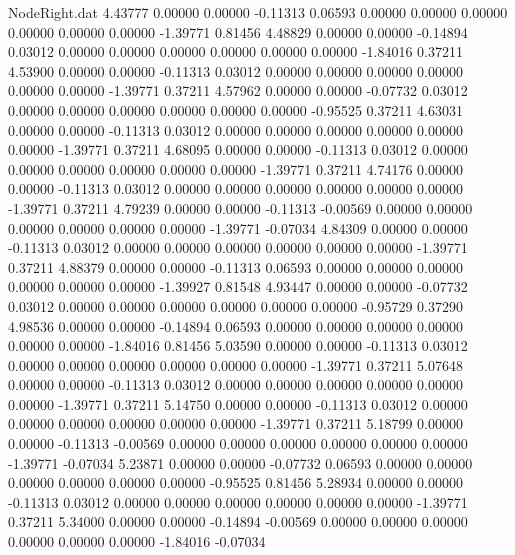 \begin{filecontents}{NodeRight.dat}
   4.43777    0.00000    0.00000    -0.11313    0.06593    0.00000    0.00000    0.00000    0.00000    0.00000    0.00000   -1.39771    0.81456
   4.48829    0.00000    0.00000    -0.14894    0.03012    0.00000    0.00000    0.00000    0.00000    0.00000    0.00000   -1.84016    0.37211
   4.53900    0.00000    0.00000    -0.11313    0.03012    0.00000    0.00000    0.00000    0.00000    0.00000    0.00000   -1.39771    0.37211
   4.57962    0.00000    0.00000    -0.07732    0.03012    0.00000    0.00000    0.00000    0.00000    0.00000    0.00000   -0.95525    0.37211
   4.63031    0.00000    0.00000    -0.11313    0.03012    0.00000    0.00000    0.00000    0.00000    0.00000    0.00000   -1.39771    0.37211
   4.68095    0.00000    0.00000    -0.11313    0.03012    0.00000    0.00000    0.00000    0.00000    0.00000    0.00000   -1.39771    0.37211
   4.74176    0.00000    0.00000    -0.11313    0.03012    0.00000    0.00000    0.00000    0.00000    0.00000    0.00000   -1.39771    0.37211
   4.79239    0.00000    0.00000    -0.11313   -0.00569    0.00000    0.00000    0.00000    0.00000    0.00000    0.00000   -1.39771   -0.07034
   4.84309    0.00000    0.00000    -0.11313    0.03012    0.00000    0.00000    0.00000    0.00000    0.00000    0.00000   -1.39771    0.37211
   4.88379    0.00000    0.00000    -0.11313    0.06593    0.00000    0.00000    0.00000    0.00000    0.00000    0.00000   -1.39927    0.81548
   4.93447    0.00000    0.00000    -0.07732    0.03012    0.00000    0.00000    0.00000    0.00000    0.00000    0.00000   -0.95729    0.37290
   4.98536    0.00000    0.00000    -0.14894    0.06593    0.00000    0.00000    0.00000    0.00000    0.00000    0.00000   -1.84016    0.81456
   5.03590    0.00000    0.00000    -0.11313    0.03012    0.00000    0.00000    0.00000    0.00000    0.00000    0.00000   -1.39771    0.37211
   5.07648    0.00000    0.00000    -0.11313    0.03012    0.00000    0.00000    0.00000    0.00000    0.00000    0.00000   -1.39771    0.37211
   5.14750    0.00000    0.00000    -0.11313    0.03012    0.00000    0.00000    0.00000    0.00000    0.00000    0.00000   -1.39771    0.37211
   5.18799    0.00000    0.00000    -0.11313   -0.00569    0.00000    0.00000    0.00000    0.00000    0.00000    0.00000   -1.39771   -0.07034
   5.23871    0.00000    0.00000    -0.07732    0.06593    0.00000    0.00000    0.00000    0.00000    0.00000    0.00000   -0.95525    0.81456
   5.28934    0.00000    0.00000    -0.11313    0.03012    0.00000    0.00000    0.00000    0.00000    0.00000    0.00000   -1.39771    0.37211
   5.34000    0.00000    0.00000    -0.14894   -0.00569    0.00000    0.00000    0.00000    0.00000    0.00000    0.00000   -1.84016   -0.07034

\end{filecontents}
